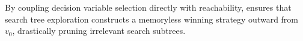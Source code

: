 \documentclass{article}
\begin{document}
\begin{appendices}
By coupling decision variable selection directly with reachability, \nocbrancher ensures that search tree exploration constructs a memoryless winning strategy outward from $v_0$, drastically pruning irrelevant search subtrees.

\end{appendices}
\end{document}

